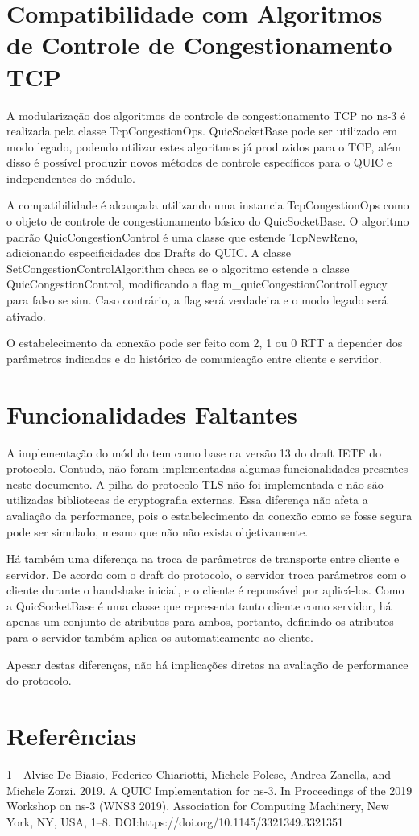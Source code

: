\documentclass{article}
\begin{document}
\section{Compatibilidade com Algoritmos de Controle de Congestionamento TCP}

A modularização dos algoritmos de controle de congestionamento TCP no ns-3 é realizada pela classe TcpCongestionOps.
QuicSocketBase pode ser utilizado em modo legado, podendo utilizar estes algoritmos já produzidos para o TCP, além disso
é possível produzir novos métodos de controle específicos para o QUIC e independentes do módulo.

A compatibilidade é alcançada utilizando uma instancia TcpCongestionOps como o objeto de controle de congestionamento
básico do QuicSocketBase. O algoritmo padrão QuicCongestionControl é uma classe que estende TcpNewReno, adicionando
especificidades dos Drafts do QUIC. A classe SetCongestionControlAlgorithm checa se o algoritmo estende a classe
QuicCongestionControl, modificando a flag m\_quicCongestionControlLegacy para falso se sim. Caso contrário, a flag será
verdadeira e o modo legado será ativado.

O estabelecimento da conexão pode ser feito com 2, 1 ou 0 RTT a depender dos parâmetros indicados e do histórico de
comunicação entre cliente e servidor.

\section{Funcionalidades Faltantes}

A implementação do módulo tem como base na versão 13 do draft IETF do protocolo. Contudo, não foram implementadas algumas
funcionalidades presentes neste documento. A pilha do protocolo TLS não foi implementada e não são utilizadas
bibliotecas de cryptografia externas. Essa diferença não afeta a avaliação da performance, pois o estabelecimento da
conexão como se fosse segura pode ser simulado, mesmo que não não exista objetivamente.

Há também uma diferença na troca de parâmetros de transporte entre cliente e servidor. De acordo com o draft do
protocolo, o servidor troca parâmetros com o cliente durante o handshake inicial, e o cliente é reponsável por
aplicá-los. Como a QuicSocketBase é uma classe que representa tanto cliente como servidor, há apenas um conjunto de
atributos para ambos, portanto, definindo os atributos para o servidor também aplica-os automaticamente ao cliente.

Apesar destas diferenças, não há implicações diretas na avaliação de performance do protocolo.

\section{Referências}
1 - Alvise De Biasio, Federico Chiariotti, Michele Polese, Andrea Zanella, and Michele Zorzi. 2019. A QUIC Implementation for ns-3. In Proceedings of the 2019 Workshop on ns-3 (WNS3 2019). Association for Computing Machinery, New York, NY, USA, 1–8. DOI:https://doi.org/10.1145/3321349.3321351
\end{document}

